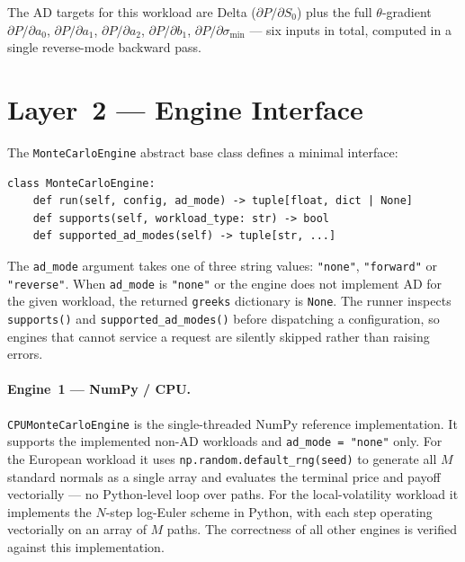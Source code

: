 The AD targets for this workload are Delta (\(\partial P / \partial S_0\)) plus
the full $\theta$-gradient \(\partial P / \partial a_0\), \(\partial P / \partial a_1\),
\(\partial P / \partial a_2\), \(\partial P / \partial b_1\),
\(\partial P / \partial \sigma_{\min}\) --- six inputs in total, computed in a
single reverse-mode backward pass.

\section{Layer~2 --- Engine Interface}
\label{sec:engine-layer}

The \texttt{MonteCarloEngine} abstract base class defines a minimal interface:

\begin{verbatim}
class MonteCarloEngine:
    def run(self, config, ad_mode) -> tuple[float, dict | None]
    def supports(self, workload_type: str) -> bool
    def supported_ad_modes(self) -> tuple[str, ...]
\end{verbatim}

The \texttt{ad\_mode} argument takes one of three string values:
\texttt{"none"}, \texttt{"forward"} or \texttt{"reverse"}. When \texttt{ad\_mode}
is \texttt{"none"} or the engine does not implement AD for the given workload,
the returned \texttt{greeks} dictionary is \texttt{None}. The runner inspects
\texttt{supports()} and \texttt{supported\_ad\_modes()} before dispatching a
configuration, so engines that cannot service a request are silently skipped
rather than raising errors.

\paragraph{Engine~1 --- NumPy / CPU.}
\texttt{CPUMonteCarloEngine} is the single-threaded NumPy reference
implementation. It supports the implemented non-AD workloads and
\texttt{ad\_mode = "none"} only.
For the European workload it uses \texttt{np.random.default\_rng(seed)} to
generate all $M$ standard normals as a single array and evaluates the terminal
price and payoff vectorially --- no Python-level loop over paths. For the
local-volatility workload it implements the $N$-step log-Euler scheme in
Python, with each step operating vectorially on an array of $M$ paths. The
correctness of all other engines is verified against this implementation.

